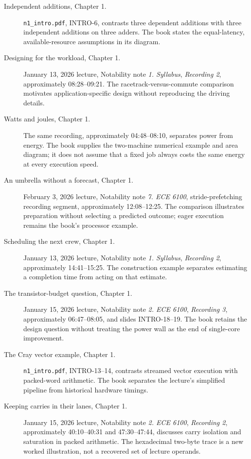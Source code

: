 \begin{description}
  \item[Independent additions, Chapter 1.] \texttt{n1\_intro.pdf}, INTRO-6, contrasts three dependent additions with three independent additions on three adders. The book states the equal-latency, available-resource assumptions in its diagram.
  \item[Designing for the workload, Chapter 1.] January 13, 2026 lecture, Notability note \emph{1. Syllabus}, \emph{Recording 2}, approximately 08:28--09:21. The racetrack-versus-commute comparison motivates application-specific design without reproducing the driving details.
  \item[Watts and joules, Chapter 1.] The same recording, approximately 04:48--08:10, separates power from energy. The book supplies the two-machine numerical example and area diagram; it does not assume that a fixed job always costs the same energy at every execution speed.
  \item[An umbrella without a forecast, Chapter 1.] February 3, 2026 lecture, Notability note \emph{7. ECE 6100}, stride-prefetching recording segment, approximately 12:08--12:25. The comparison illustrates preparation without selecting a predicted outcome; eager execution remains the book's processor example.
  \item[Scheduling the next crew, Chapter 1.] January 13, 2026 lecture, Notability note \emph{1. Syllabus}, \emph{Recording 2}, approximately 14:41--15:25. The construction example separates estimating a completion time from acting on that estimate.
  \item[The transistor-budget question, Chapter 1.] January 15, 2026 lecture, Notability note \emph{2. ECE 6100}, \emph{Recording 3}, approximately 06:47--08:05, and slides INTRO-18--19. The book retains the design question without treating the power wall as the end of single-core improvement.
  \item[The Cray vector example, Chapter 1.] \texttt{n1\_intro.pdf}, INTRO-13--14, contrasts streamed vector execution with packed-word arithmetic. The book separates the lecture's simplified pipeline from historical hardware timings.
  \item[Keeping carries in their lanes, Chapter 1.] January 15, 2026 lecture, Notability note \emph{2. ECE 6100}, \emph{Recording 2}, approximately 40:10--40:31 and 47:30--47:44, discusses carry isolation and saturation in packed arithmetic. The hexadecimal two-byte trace is a new worked illustration, not a recovered set of lecture operands.

\end{description}
